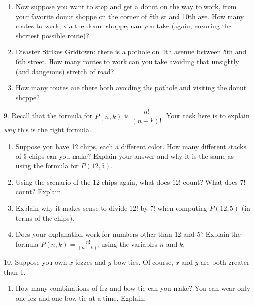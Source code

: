 \documentclass[10pt,]{book}
\theoremstyle{plain}
\theoremstyle{definition}
\theoremstyle{definition}
\theoremstyle{definition}
\numberwithin{equation}{chapter}
\begin{document}
\begin{exerciselist}
\begin{enumerate}[label=(\alph*)]
\item\hypertarget{li-789}{}
                Now suppose you want to stop and get a donut on the way to work, from your favorite donut shoppe on the corner of 8th st and 10th ave. How many routes to work, via the donut shoppe, can you take (again, ensuring the shortest possible route)?


\item\hypertarget{li-790}{}
                Disaster Strikes Gridtown: there is a pothole on 4th avenue between 5th and 6th street. How many routes to work can you take avoiding that unsightly (and dangerous) stretch of road?


\item\hypertarget{li-791}{}
                How many routes are there both avoiding the pothole and visiting the donut shoppe?


\end{enumerate}
\par\smallskip
\item[9.]\hypertarget{exercise-132}{}
            Recall that the formula for \(P(n,k)\) is \(\dfrac{n!}{(n-k)!}\). Your task here is to explain \emph{why} this is the right formula.
\leavevmode%
\begin{enumerate}[label=(\alph*)]
\item\hypertarget{li-792}{}
                Suppose you have 12 chips, each a different color. How many different stacks of 5 chips can you make? Explain your answer and why it is the same as using the formula for \(P(12,5)\).


\item\hypertarget{li-793}{}
                Using the scenario of the 12 chips again, what does \(12!\) count? What does \(7!\) count? Explain.


\item\hypertarget{li-794}{}
                Explain why it makes sense to divide \(12!\) by \(7!\) when computing \(P(12,5)\) (in terms of the chips).


\item\hypertarget{li-795}{}
                Does your explanation work for numbers other than 12 and 5? Explain the formula \(P(n,k) = \frac{n!}{(n-k)!}\) using the variables \(n\) and \(k\).


\end{enumerate}
\par\smallskip
\item[10.]\hypertarget{exercise-133}{}
            Suppose you own \(x\) fezzes and \(y\) bow ties. Of course, \(x\) and \(y\) are both greater than 1.
\leavevmode%
\begin{enumerate}[label=(\alph*)]
\item\hypertarget{li-796}{}
                How many combinations of fez and bow tie can you make? You can wear only one fez and one bow tie at a time. Explain.



\end{enumerate}
\end{exerciselist}
\end{document}
